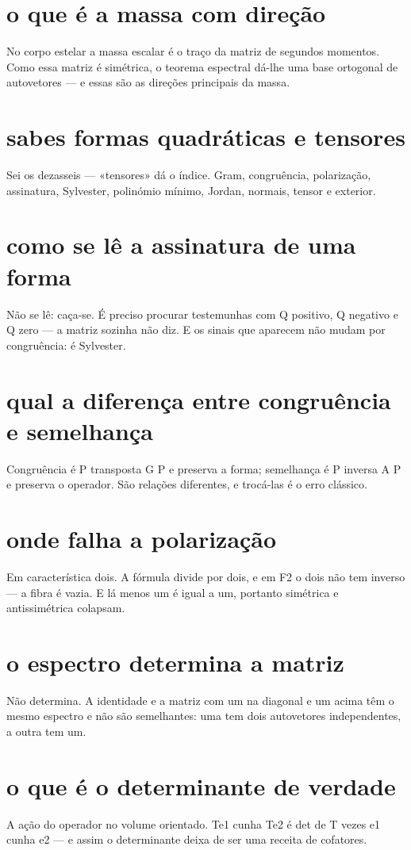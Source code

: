 \documentclass[11pt,a4paper]{article}
\begin{document}
\section{o que é a massa com direção}
No corpo estelar a massa escalar é o traço da matriz de segundos momentos. Como essa
matriz é simétrica, o teorema espectral dá-lhe uma base ortogonal de autovetores --- e
essas são as direções principais da massa.

\section{sabes formas quadráticas e tensores}
Sei os dezasseis --- «tensores» dá o índice. Gram, congruência, polarização, assinatura,
Sylvester, polinómio mínimo, Jordan, normais, tensor e exterior.

\section{como se lê a assinatura de uma forma}
Não se lê: caça-se. É preciso procurar testemunhas com Q positivo, Q negativo e Q zero ---
a matriz sozinha não diz. E os sinais que aparecem não mudam por congruência: é Sylvester.

\section{qual a diferença entre congruência e semelhança}
Congruência é P transposta G P e preserva a forma; semelhança é P inversa A P e preserva
o operador. São relações diferentes, e trocá-las é o erro clássico.

\section{onde falha a polarização}
Em característica dois. A fórmula divide por dois, e em F2 o dois não tem inverso --- a
fibra é vazia. E lá menos um é igual a um, portanto simétrica e antissimétrica colapsam.

\section{o espectro determina a matriz}
Não determina. A identidade e a matriz com um na diagonal e um acima têm o mesmo
espectro e não são semelhantes: uma tem dois autovetores independentes, a outra tem um.

\section{o que é o determinante de verdade}
A ação do operador no volume orientado. Te1 cunha Te2 é det de T vezes e1 cunha e2 --- e
assim o determinante deixa de ser uma receita de cofatores.
\end{document}
